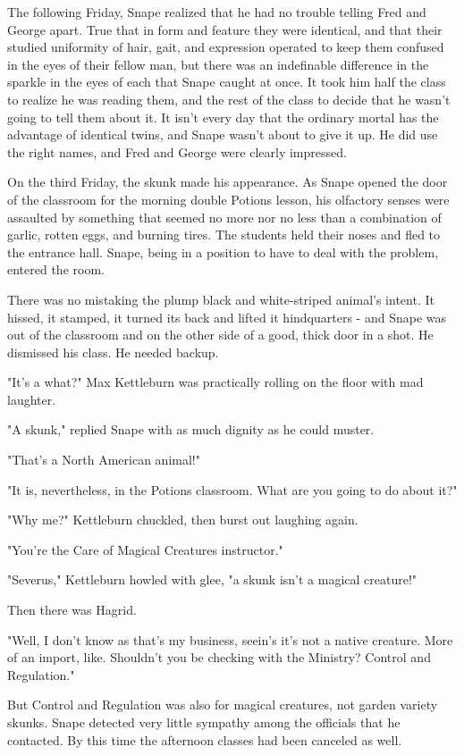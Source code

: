 \documentclass[a4paper,11pt]{article}
\begin{document}
The following Friday, Snape realized that he had no trouble telling Fred and George apart. True that in form and feature they were identical, and that their studied uniformity of hair, gait, and expression operated to keep them confused in the eyes of their fellow man, but there was an indefinable difference in the sparkle in the eyes of each that Snape caught at once. It took him half the class to realize he was reading them, and the rest of the class to decide that he wasn't going to tell them about it. It isn't every day that the ordinary mortal has the advantage of identical twins, and Snape wasn't about to give it up. He did use the right names, and Fred and George were clearly impressed.

On the third Friday, the skunk made his appearance. As Snape opened the door of the classroom for the morning double Potions lesson, his olfactory senses were assaulted by something that seemed no more nor no less than a combination of garlic, rotten eggs, and burning tires. The students held their noses and fled to the entrance hall. Snape, being in a position to have to deal with the problem, entered the room.

There was no mistaking the plump black and white-striped animal's intent. It hissed, it stamped, it turned its back and lifted it hindquarters - and Snape was out of the classroom and on the other side of a good, thick door in a shot. He dismissed his class. He needed backup.

"It's a what?" Max Kettleburn was practically rolling on the floor with mad laughter.

"A skunk," replied Snape with as much dignity as he could muster.

"That's a North American animal!"

"It is, nevertheless, in the Potions classroom. What are you going to do about it?"

"Why me?" Kettleburn chuckled, then burst out laughing again.

"You're the Care of Magical Creatures instructor."

"Severus," Kettleburn howled with glee, "a skunk isn't a magical creature!"

Then there was Hagrid.

"Well, I don't know as that's my business, seein's it's not a native creature. More of an import, like. Shouldn't you be checking with the Ministry? Control and Regulation."

But Control and Regulation was also for magical creatures, not garden variety skunks. Snape detected very little sympathy among the officials that he contacted. By this time the afternoon classes had been canceled as well.
\end{document}
